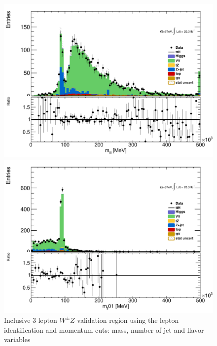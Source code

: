 \begin{figure}[!htbp]
\begin{minipage}[h]{0.5\textwidth}
    \centering \includegraphics[width=\textwidth]{figs/WZ/plotCand_3lep_VV_Mlll}
  \end{minipage}\hfill
  \begin{minipage}[h]{0.5\textwidth}
    \centering \includegraphics[width=\textwidth]{figs/WZ/plotCand_3lep_VV_Mll01ML}
  \end{minipage}\hfill

\caption{Inclusive 3 lepton $W^{\pm}Z$ validation region using the \tth lepton identification and momentum cuts: mass, number of jet and flavor variables} 
\label{figure:background_wz_incl}
\end{figure} 



